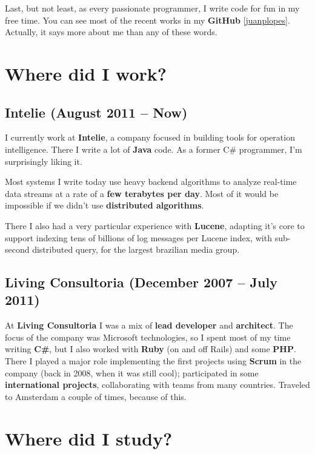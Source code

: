 \documentclass[a4paper,12pt,oneside]{article}
\begin{document}
	Last, but not least, as every passionate programmer, I write code for fun in my free time. You can see most of the recent works in my \textbf{GitHub} [\href{http://github.com/juanplopes}{juanplopes}]. Actually, it says more about me than any of these words.
	
\section*{Where did I work?}

\subsection*{Intelie \small{ (August 2011 -- Now)}}

	I currently work at \textbf{Intelie}, a company focused in building tools for operation intelligence. There I write a lot of \textbf{Java} code. As a former C\# programmer, I'm surprisingly liking it.
	
	Most systems I write today use heavy backend algorithms to analyze real-time data streams at a rate of a \textbf{few terabytes per day}. Most of it would be impossible if we didn't use \textbf{distributed algorithms}. 
	
	There I also had a very particular experience with \textbf{Lucene}, adapting it's core to support indexing tens of billions of log messages per Lucene index, with sub-second distributed query, for the largest brazilian media group.

\subsection*{Living Consultoria \small{ (December 2007 -- July 2011)}}

	At \textbf{Living Consultoria} I was a mix of \textbf{lead developer} and \textbf{architect}. The focus of the company was Microsoft technologies, so I spent most of my time writing \textbf{C\#}, but I also worked with \textbf{Ruby} (on and off Rails) and some \textbf{PHP}. There I played a major role implementing the first projects using \textbf{Scrum} in the company (back in 2008, when it was still cool); participated in some \textbf{international projects}, collaborating with teams from many countries. Traveled to Amsterdam a couple of times, because of this.

\section*{Where did I study?}
\end{document}
